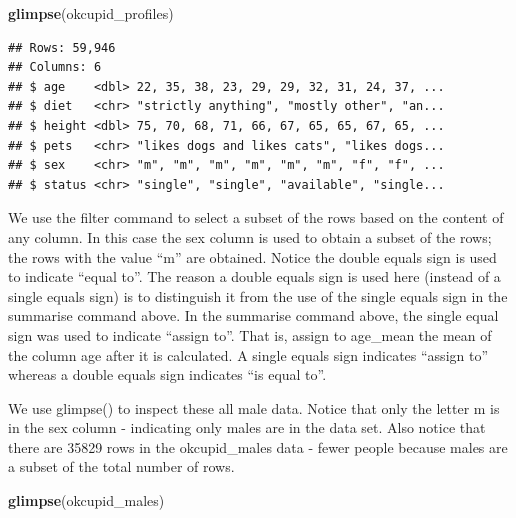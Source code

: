 \documentclass[
]{krantz}
\makeatletter
\newenvironment{Shaded}{\begin{snugshade}}{\end{snugshade}}
\newcommand{\KeywordTok}[1]{\textcolor[rgb]{0.27,0.27,0.27}{\textbf{#1}}}
\newcommand{\NormalTok}[1]{#1}
\newcommand{\OperatorTok}[1]{\textcolor[rgb]{0.43,0.43,0.43}{\textbf{#1}}}
\newcommand{\StringTok}[1]{\textcolor[rgb]{0.5,0.5,0.5}{#1}}
\newenvironment{kframe}{%
\medskip{}
\setlength{\fboxsep}{.8em}
 \def\at@end@of@kframe{}%
 \ifinner\ifhmode%
  \def\at@end@of@kframe{\end{minipage}}%
  \begin{minipage}{\columnwidth}%
 \fi\fi%
 \def\FrameCommand##1{\hskip\@totalleftmargin \hskip-\fboxsep
 \colorbox{shadecolor}{##1}\hskip-\fboxsep
     \hskip-\linewidth \hskip-\@totalleftmargin \hskip\columnwidth}%
 \MakeFramed {\advance\hsize-\width
   \@totalleftmargin\z@ \linewidth\hsize
   \@setminipage}}%
 {\par\unskip\endMakeFramed%
 \at@end@of@kframe}
\renewenvironment{Shaded}{\begin{kframe}}{\end{kframe}}
\makeatother
\begin{document}
\begin{Shaded}
\begin{Highlighting}[]
\KeywordTok{glimpse}\NormalTok{(okcupid_profiles)}
\end{Highlighting}
\end{Shaded}

\begin{verbatim}
## Rows: 59,946
## Columns: 6
## $ age    <dbl> 22, 35, 38, 23, 29, 29, 32, 31, 24, 37, ...
## $ diet   <chr> "strictly anything", "mostly other", "an...
## $ height <dbl> 75, 70, 68, 71, 66, 67, 65, 65, 67, 65, ...
## $ pets   <chr> "likes dogs and likes cats", "likes dogs...
## $ sex    <chr> "m", "m", "m", "m", "m", "m", "f", "f", ...
## $ status <chr> "single", "single", "available", "single...
\end{verbatim}

We use the filter command to select a subset of the rows based on the content of any column. In this case the sex column is used to obtain a subset of the rows; the rows with the value ``m'' are obtained. Notice the double equals sign is used to indicate ``equal to''. The reason a double equals sign is used here (instead of a single equals sign) is to distinguish it from the use of the single equals sign in the summarise command above. In the summarise command above, the single equal sign was used to indicate ``assign to''. That is, assign to age\_mean the mean of the column age after it is calculated. A single equals sign indicates ``assign to'' whereas a double equals sign indicates ``is equal to''.

\begin{Shaded}
\end{Shaded}

We use glimpse() to inspect these all male data. Notice that only the letter m is in the sex column - indicating only males are in the data set. Also notice that there are 35829 rows in the okcupid\_males data - fewer people because males are a subset of the total number of rows.

\begin{Shaded}
\begin{Highlighting}[]
\KeywordTok{glimpse}\NormalTok{(okcupid_males)}
\end{Highlighting}
\end{Shaded}
\end{document}
